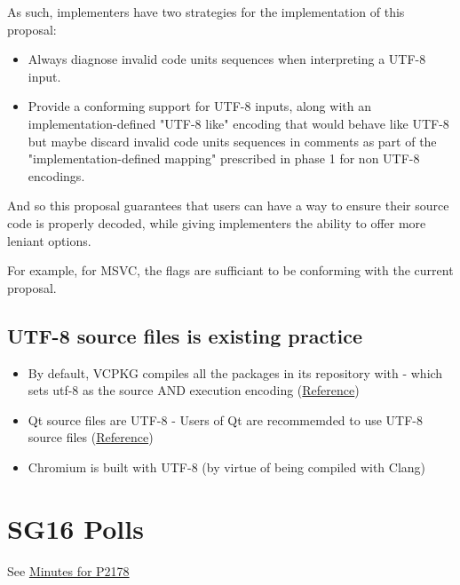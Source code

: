 \documentclass{wg21}
\begin{document}
As such, implementers have two strategies for the implementation of this proposal:

\begin{itemize}
\item Always diagnose invalid code units sequences when interpreting a UTF-8 input.
\item Provide a conforming support for UTF-8 inputs, along with an implementation-defined "UTF-8 like" encoding that would behave like UTF-8 but maybe discard
invalid code units sequences in comments as part of the "implementation-defined mapping" prescribed in phase 1 for non UTF-8 encodings.
\end{itemize}

And so this proposal guarantees that users can have a way to ensure their source code is properly decoded, while giving implementers
the ability to offer more leniant options.

For example, for MSVC, the flags  are sufficiant to be conforming with the current proposal.


\subsection{UTF-8 source files is existing practice}

\begin{itemize}
    \item By default, VCPKG compiles all the packages in its repository with  - which sets utf-8 as the source AND execution encoding (\href{https://github.com/vicroms/vcpkg/blob/master/scripts/toolchains/windows.cmake#L16}{Reference})
    \item Qt source files are UTF-8 - Users of Qt are recommemded to use UTF-8 source files (\href{https://wiki.qt.io/Strings_and_encodings_in_Qt}{Reference})
    \item Chromium is built with UTF-8 (by virtue of being compiled with Clang)
\end{itemize}

\section{SG16 Polls}

See \href{https://github.com/sg16-unicode/sg16-meetings/blob/master/README-2020.md}{Minutes for P2178}
\end{document}
